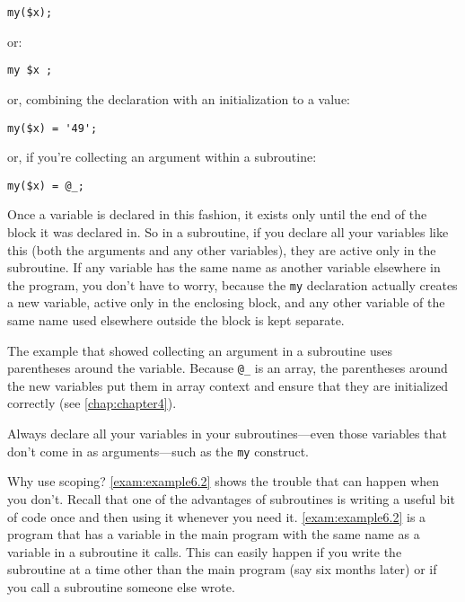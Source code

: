 \begin{lstlisting}
my($x); 
\end{lstlisting}

or:

\begin{lstlisting}
my $x ; 
\end{lstlisting}

or, combining the declaration with an initialization to a value:

\begin{lstlisting}
my($x) = '49'; 
\end{lstlisting}

or, if you're collecting an argument within a subroutine:

\begin{lstlisting}
my($x) = @_; 
\end{lstlisting}

Once a variable is declared in this fashion, it exists only until the end of the block it was declared in. So in a subroutine, if you declare all your variables like this (both the arguments and any other variables), they are active only in the subroutine. If any variable has the same name as another variable elsewhere in the program, you don't have to worry, because the \verb|my| declaration actually creates a new variable, active only in the enclosing block, and any other variable of the same name used elsewhere outside the block is kept separate.

The example that showed collecting an argument in a subroutine uses parentheses around the variable. Because \verb|@_| is an array, the parentheses around the new variables put them in array context and ensure that they are initialized correctly (see \autoref{chap:chapter4}).

\begin{adjustwidth}{2cm}{2cm}
  Always declare all your variables in your subroutines—even those variables that don't come in as arguments—such as the \verb|my| construct. 
\end{adjustwidth}

Why use scoping? \autoref{exam:example6.2} shows the trouble that can happen when you don't. Recall that one of the advantages of subroutines is writing a useful bit of code once and then using it whenever you need it.  \autoref{exam:example6.2} is a program that has a variable in the main program with the same name as a variable in a subroutine it calls. This can easily happen if you write the subroutine at a time other than the main program (say six months later) or if you call a subroutine someone else wrote. 

